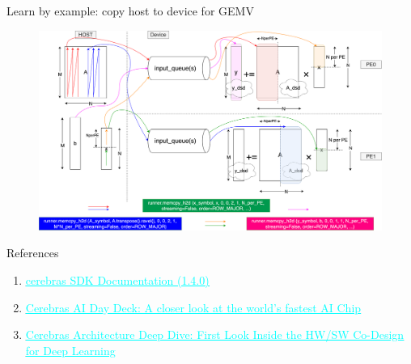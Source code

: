 \documentclass[dvipdfmx, 11pt, aspectratio=169]{beamer}   %
\newcommand{\ulhref}[2]{\href{#1}{\textcolor{cyan}{\uline{#2}}}}
\begin{document}
\begin{frame}{Learn by example: copy host to device for GEMV}
\vspace{-0.5\baselineskip}
\begin{figure}
    \includegraphics[scale=0.07]{img/csCopyh2d.png}
\end{figure}
\end{frame}
\begin{frame}[fragile]{References}
  \begin{enumerate}\footnotesize
    \item \ulhref{https://sdk.cerebras.net/computing-with-cerebras}{cerebras SDK Documentation (1.4.0)}
    \item \ulhref{https://www.slideshare.net/slideshow/cerebras-ai-day-deck-a-closer-look-at-the-worlds-fastest-ai-chip/266911791}{Cerebras AI Day Deck: A closer look at the world's fastest AI Chip}
    \item \ulhref{https://hc34.hotchips.org/assets/program/conference/day2/Machine\%20Learning/HC2022_Cerebras_Final_v02.pdf}{Cerebras Architecture Deep Dive: First Look Inside the HW/SW Co-Design for Deep Learning}
  \end{enumerate}
\end{frame}
\end{document}
